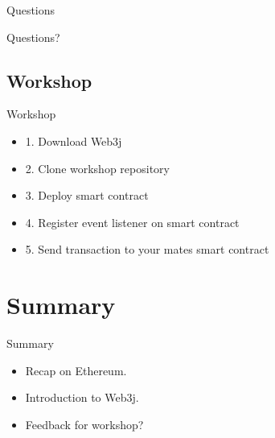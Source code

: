 \documentclass{beamer}
\begin{document}
\begin{frame}{Questions}
	\begin{center}
		Questions?
	\end{center}
\end{frame}

\subsection{Workshop}

\begin{frame}{Workshop}
	\begin{itemize}
		\item {
			1. Download Web3j
		}
		\item {
			2. Clone workshop repository
		}
		\item {
			3. Deploy smart contract
		}
		\item {
			4. Register event listener on smart contract
		}
		\item {
			5. Send transaction to your mates smart contract
		}
	\end{itemize}
\end{frame}



\section*{Summary}

\begin{frame}{Summary}
  \begin{itemize}
  \item
    Recap on \alert{Ethereum}.
  \item
    Introduction to \alert{Web3j}.
  \end{itemize}
  
  \begin{itemize}
  \item
    Feedback for workshop?
  \end{itemize}
\end{frame}



\appendix
\end{document}
